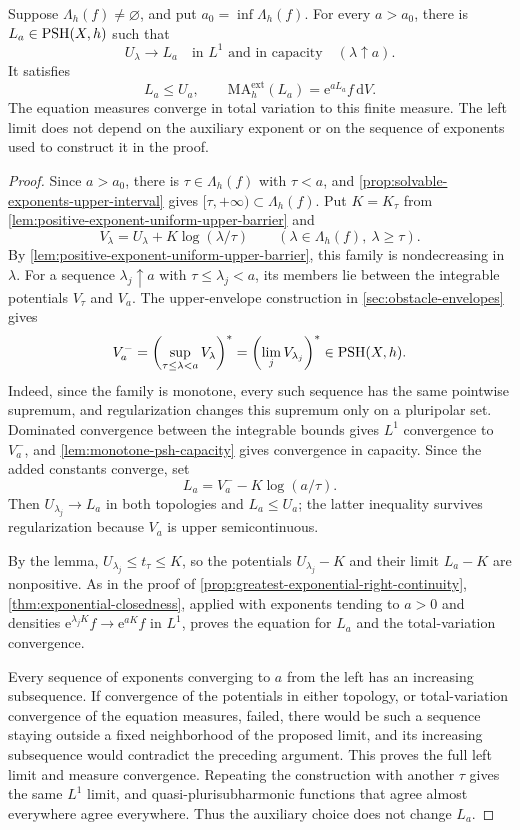 \begin{proposition}\label{prop:greatest-exponential-left-limit}
Suppose $\Lambda_h(f)\ne\varnothing$, and put $a_0=\inf\Lambda_h(f)$. For every $a>a_0$, there is $L_a\in\mathrm{PSH}(X,h)$ such that
\[
 U_\lambda\longrightarrow L_a
       \quad\text{in }L^1\text{ and in capacity}\quad(\lambda\uparrow a).
\]
It satisfies
\[
 L_a\leq U_a,\qquad
 \mathrm{MA}^{\mathrm{ext}}_h(L_a)=\mathrm e^{aL_a}f\,\mathrm dV.
\]
The equation measures converge in total variation to this finite measure. The left limit does not depend on the auxiliary exponent or on the sequence of exponents used to construct it in the proof.
\end{proposition}
\begin{proof}
Since $a>a_0$, there is $\tau\in\Lambda_h(f)$ with $\tau<a$, and \cref{prop:solvable-exponents-upper-interval} gives $[\tau,+\infty)\subset\Lambda_h(f)$. Put $K=K_\tau$ from \cref{lem:positive-exponent-uniform-upper-barrier} and
\[
 V_\lambda=U_\lambda+K\log(\lambda/\tau)
       \qquad(\lambda\in\Lambda_h(f),\ \lambda\geq\tau).
\]
By \cref{lem:positive-exponent-uniform-upper-barrier}, this family is nondecreasing in $\lambda$. For a sequence $\lambda_j\uparrow a$ with $\tau\leq\lambda_j<a$, its members lie between the integrable potentials $V_\tau$ and $V_a$. The upper-envelope construction in \cref{sec:obstacle-envelopes} gives
\[
 V^-_a=\left(\sup_{\tau\leq\lambda<a}V_\lambda\right)^*
        =\left(\lim_jV_{\lambda_j}\right)^*\in\mathrm{PSH}(X,h).
\]
Indeed, since the family is monotone, every such sequence has the same pointwise supremum, and regularization changes this supremum only on a pluripolar set. Dominated convergence between the integrable bounds gives $L^1$ convergence to $V^-_a$, and \cref{lem:monotone-psh-capacity} gives convergence in capacity. Since the added constants converge, set
\[
 L_a=V^-_a-K\log(a/\tau).
\]
Then $U_{\lambda_j}\to L_a$ in both topologies and $L_a\leq U_a$; the latter inequality survives regularization because $V_a$ is upper semicontinuous.

By the lemma, $U_{\lambda_j}\leq t_\tau\leq K$, so the potentials $U_{\lambda_j}-K$ and their limit $L_a-K$ are nonpositive. As in the proof of \cref{prop:greatest-exponential-right-continuity}, \cref{thm:exponential-closedness}, applied with exponents tending to $a>0$ and densities $\mathrm e^{\lambda_jK}f\to\mathrm e^{aK}f$ in $L^1$, proves the equation for $L_a$ and the total-variation convergence.

Every sequence of exponents converging to $a$ from the left has an increasing subsequence. If convergence of the potentials in either topology, or total-variation convergence of the equation measures, failed, there would be such a sequence staying outside a fixed neighborhood of the proposed limit, and its increasing subsequence would contradict the preceding argument. This proves the full left limit and measure convergence. Repeating the construction with another $\tau$ gives the same $L^1$ limit, and quasi-plurisubharmonic functions that agree almost everywhere agree everywhere. Thus the auxiliary choice does not change $L_a$.
\end{proof}

